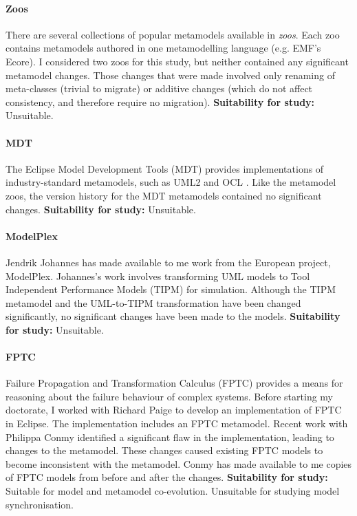 \paragraph{Zoos} %
\label{par:zoos}
There are several collections of popular metamodels available in \emph{zoos}. Each zoo contains metamodels authored in one metamodelling language (e.g. EMF's Ecore). I considered two zoos for this study, but neither contained any significant metamodel changes. Those changes that were made involved only renaming of meta-classes (trivial to migrate) or additive changes (which do not affect consistency, and therefore require no migration). \textbf{Suitability for study:} Unsuitable.

\paragraph{MDT} %
\label{par:mdt}
The Eclipse Model Development Tools (MDT) \cite{mdt} provides implementations of industry-standard metamodels, such as UML2 \cite{uml212} and OCL \cite{ocl2}. Like the metamodel zoos, the version history for the MDT metamodels contained no significant changes. \textbf{Suitability for study:} Unsuitable.

\paragraph{ModelPlex} %
\label{par:modelplex}
Jendrik Johannes has made available to me work from the European project, ModelPlex. Johannes's work involves transforming UML models to Tool Independent Performance Models (TIPM) for simulation. Although the TIPM metamodel and the UML-to-TIPM transformation have been changed significantly, no significant changes have been made to the models. \textbf{Suitability for study:} Unsuitable.

\paragraph{FPTC} %
\label{par:fptc}
Failure Propagation and Transformation Calculus (FPTC) provides a means for reasoning about the failure behaviour of complex systems. Before starting my doctorate, I worked with Richard Paige to develop an implementation of FPTC in Eclipse. The implementation includes an FPTC metamodel. Recent work with Philippa Conmy identified a significant flaw in the implementation, leading to changes to the metamodel. These changes caused existing FPTC models to become inconsistent with the metamodel. Conmy has made available to me copies of FPTC models from before and after the changes. \textbf{Suitability for study:} Suitable for model and metamodel co-evolution. Unsuitable for studying model synchronisation.

